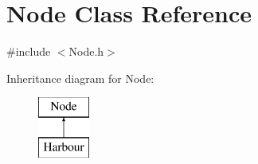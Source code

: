 \hypertarget{class_node}{}\section{Node Class Reference}
\label{class_node}


{\ttfamily \#include $<$Node.\+h$>$}

Inheritance diagram for Node\+:\begin{figure}[H]
\begin{center}
\leavevmode
\includegraphics[height=2.000000cm]{dc/d8f/class_node}
\end{center}
\end{figure}
